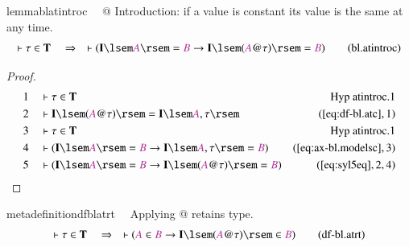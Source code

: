 \begin{restatable}{lemma}{blatintroc}~~ @ Introduction: if a value is constant
its value is the same at any time.
\begin{align}
\vdash \tau \in \mathbf{T}\quad\Rightarrow\quad \vdash ( \mathbf{I} \lsem
    \mc{A} \rsem = \mc{B} \rightarrow \mathbf{I} \lsem ( \mc{A} @ \tau ) \rsem
    = \mc{B} )\label{eq:bl.atintroc}\tag{bl.atintroc}
\end{align}
\end{restatable}

\begin{proof}
\begin{align}
  1 &&  & \vdash \tau \in \mathbf{T}&\text{Hyp~atintroc.1}\notag%
  \\ 2 &&  & \vdash \mathbf{I} \lsem ( \mc{A} @ \tau ) \rsem = \mathbf{I} \lsem
      \mc{A} , \tau
      \rsem&(\mbox{\ref{eq:df-bl.atc}},1)\notag
  \\ 3 &&  & \vdash \tau \in
      \mathbf{T}&\text{Hyp~atintroc.1}\notag%
  \\ 4 &&  & \vdash ( \mathbf{I} \lsem \mc{A} \rsem = \mc{B} \rightarrow
      \mathbf{I} \lsem \mc{A} , \tau \rsem = \mc{B}
      )&(\mbox{\ref{eq:ax-bl.modelsc}},3)\notag
  \\ 5 &&  & \vdash ( \mathbf{I} \lsem \mc{A} \rsem = \mc{B} \rightarrow
      \mathbf{I} \lsem ( \mc{A} @ \tau ) \rsem = \mc{B}
      )&(\mbox{\ref{eq:syl5eq}},2,4)\notag
\end{align}
\end{proof}

\begin{restatable}{metadefinition}{dfblatrt}~~ Applying @ retains type.
\begin{align}
\vdash \tau \in \mathbf{T}\quad\Rightarrow\quad \vdash ( \mc{A} \in \mc{B}
    \rightarrow \mathbf{I} \lsem ( \mc{A} @ \tau ) \rsem \in \mc{B}
    )\label{eq:df-bl.atrt}\tag{df-bl.atrt}
\end{align}
\end{restatable}

